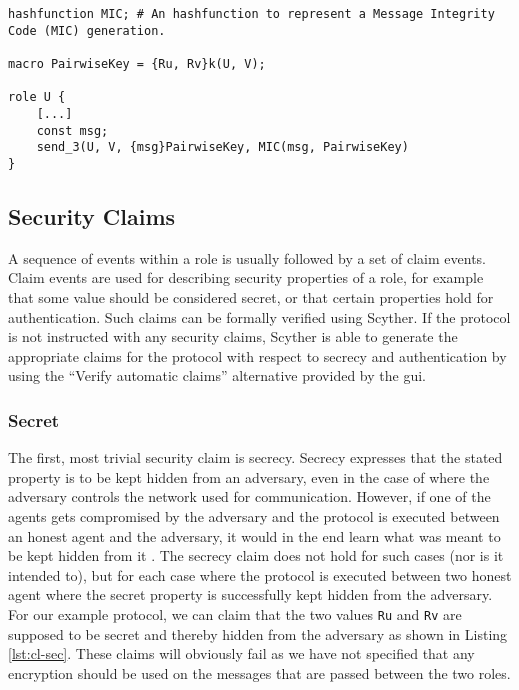 \begin{lstlisting}[caption={Example on how to use hashfunctions, macros and encryption.}, label={lst:crypt}]
hashfunction MIC; # An hashfunction to represent a Message Integrity Code (MIC) generation.

macro PairwiseKey = {Ru, Rv}k(U, V);

role U {
	[...]
	const msg;
	send_3(U, V, {msg}PairwiseKey, MIC(msg, PairwiseKey)
}
\end{lstlisting}


\subsection{Security Claims}
\label{subsec:claims}

A sequence of events within a role is usually followed by a set of claim events. Claim events are used for describing security properties of a role, for example that some value should be considered secret, or that certain properties hold for authentication. Such claims can be formally verified using Scyther. If the protocol is not instructed with any security claims, Scyther is able to generate the appropriate claims  for the protocol with respect to secrecy and authentication by using the ``Verify automatic claims'' alternative provided by the \gls{gui}.

\subsubsection{Secret}


The first, most trivial security claim is secrecy. Secrecy expresses that the stated property is to be kept hidden from an adversary, even in the case of where the adversary controls the network used for communication. However, if one of the agents gets compromised by the adversary and the protocol is executed between an honest agent and the adversary, it would in the end learn what was meant to be kept hidden from it \cite{cremers2005operational}. The secrecy claim does not hold for such cases (nor is it intended to), but for each case where the protocol is executed between two honest agent where the secret property is successfully kept hidden from the adversary. For our example protocol, we can claim that the two values \texttt{Ru} and \texttt{Rv} are supposed to be secret and thereby hidden from the adversary as shown in Listing \ref{lst:cl-sec}. These claims will obviously fail as we have not specified that any encryption should be used on the messages that are passed between the two roles.\newline

